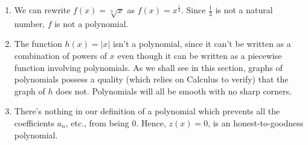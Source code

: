 \documentclass{ximera}
\begin{document}
\begin{example}
\begin{explanation}
\begin{enumerate}
\item  We can rewrite $f(x) =\sqrt[3]{x}$ as $f(x) = x^{\frac{1}{3}}$.  Since $\frac{1}{3}$ is not a natural number, $f$ is not a polynomial.

\item  The function $h(x) = |x|$ isn't a polynomial, since it can't be written as a combination of powers of $x$ even though it can be written as a piecewise function involving polynomials.  As we shall see in this section, graphs of polynomials possess a quality (which relies on Calculus to verify) that the graph of $h$ does not.  Polynomials will all be smooth with no sharp corners.

\item  There's nothing in our definition of a polynomial which prevents all the coefficients $a_{n}$, etc., from being $0$.  Hence, $z(x) = 0$, is an honest-to-goodness polynomial.

\end{enumerate}
\end{explanation}
\end{example}
\end{document}
